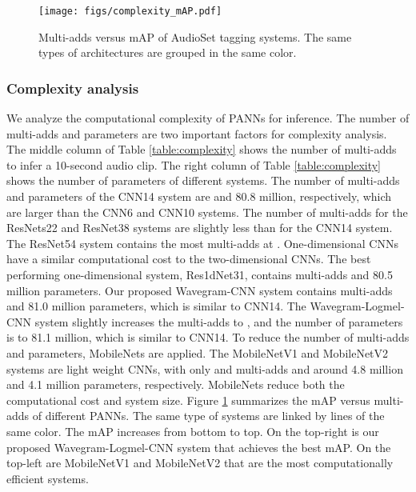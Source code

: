 \documentclass[journal]{IEEEtran}
\begin{document}
\begin{figure}[t]
  \centering
  \centerline{\texttt{[image: figs/complexity\_mAP.pdf]}}
  \caption{Multi-adds versus mAP of AudioSet tagging systems. The same types of architectures are grouped in the same color.}
  \label{fig:complexity_mAP}
\end{figure}

\subsubsection{Complexity analysis}
We analyze the computational complexity of PANNs for inference. The number of multi-adds and parameters are two important factors for complexity analysis. The middle column of Table \ref{table:complexity} shows the number of multi-adds to infer a 10-second audio clip. The right column of Table \ref{table:complexity} shows the number of parameters of different systems. The number of multi-adds and parameters of the CNN14 system are  and 80.8 million, respectively, which are larger than the CNN6 and CNN10 systems. The number of multi-adds for the ResNets22 and ResNet38 systems are slightly less than for the CNN14 system. The ResNet54 system contains the most multi-adds at . One-dimensional CNNs have a similar computational cost to the two-dimensional CNNs. The best performing one-dimensional system, Res1dNet31, contains  multi-adds and 80.5 million parameters. Our proposed Wavegram-CNN system contains  multi-adds and 81.0 million parameters, which is similar to CNN14. The Wavegram-Logmel-CNN system slightly increases the multi-adds to , and the number of parameters is to 81.1 million, which is similar to CNN14. To reduce the number of multi-adds and parameters, MobileNets are applied. The MobileNetV1 and MobileNetV2 systems are light weight CNNs, with only  and  multi-adds and around 4.8 million and 4.1 million parameters, respectively. MobileNets reduce both the computational cost and system size. Figure \ref{fig:complexity_mAP} summarizes the mAP versus multi-adds of different PANNs. The same type of systems are linked by lines of the same color. The mAP increases from bottom to top. On the top-right is our proposed Wavegram-Logmel-CNN system that achieves the best mAP. On the top-left are MobileNetV1 and MobileNetV2 that are the most computationally efficient systems.
\end{document}
